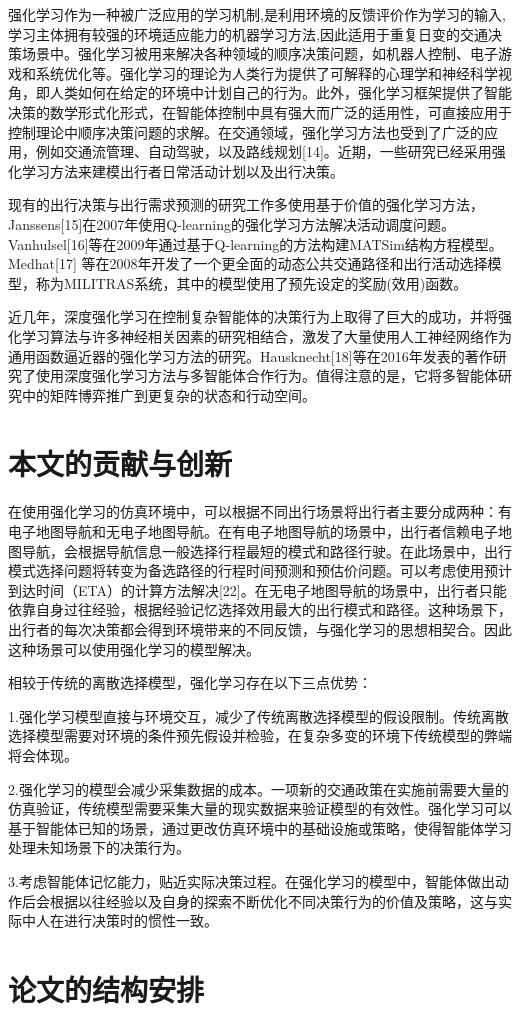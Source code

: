 强化学习作为一种被广泛应用的学习机制,是利用环境的反馈评价作为学习的输入,学习主体拥有较强的环境适应能力的机器学习方法,因此适用于重复日变的交通决策场景中。强化学习被用来解决各种领域的顺序决策问题，如机器人控制、电子游戏和系统优化等。强化学习的理论为人类行为提供了可解释的心理学和神经科学视角，即人类如何在给定的环境中计划自己的行为。此外，强化学习框架提供了智能决策的数学形式化形式，在智能体控制中具有强大而广泛的适用性，可直接应用于控制理论中顺序决策问题的求解。在交通领域，强化学习方法也受到了广泛的应用，例如交通流管理、自动驾驶，以及路线规划[14]。近期，一些研究已经采用强化学习方法来建模出行者日常活动计划以及出行决策。

现有的出行决策与出行需求预测的研究工作多使用基于价值的强化学习方法，Janssens[15]在2007年使用Q-learning的强化学习方法解决活动调度问题。Vanhulsel[16]等在2009年通过基于Q-learning的方法构建MATSim结构方程模型。Medhat[17] 等在2008年开发了一个更全面的动态公共交通路径和出行活动选择模型，称为MILITRAS系统，其中的模型使用了预先设定的奖励(效用)函数。

近几年，深度强化学习在控制复杂智能体的决策行为上取得了巨大的成功，并将强化学习算法与许多神经相关因素的研究相结合，激发了大量使用人工神经网络作为通用函数逼近器的强化学习方法的研究。Hausknecht[18]等在2016年发表的著作研究了使用深度强化学习方法与多智能体合作行为。值得注意的是，它将多智能体研究中的矩阵博弈推广到更复杂的状态和行动空间。


\section{本文的贡献与创新}

在使用强化学习的仿真环境中，可以根据不同出行场景将出行者主要分成两种：有电子地图导航和无电子地图导航。在有电子地图导航的场景中，出行者信赖电子地图导航，会根据导航信息一般选择行程最短的模式和路径行驶。在此场景中，出行模式选择问题将转变为备选路径的行程时间预测和预估价问题。可以考虑使用预计到达时间（ETA）的计算方法解决[22]。在无电子地图导航的场景中，出行者只能依靠自身过往经验，根据经验记忆选择效用最大的出行模式和路径。这种场景下，出行者的每次决策都会得到环境带来的不同反馈，与强化学习的思想相契合。因此这种场景可以使用强化学习的模型解决。

相较于传统的离散选择模型，强化学习存在以下三点优势：

1.强化学习模型直接与环境交互，减少了传统离散选择模型的假设限制。传统离散选择模型需要对环境的条件预先假设并检验，在复杂多变的环境下传统模型的弊端将会体现。

2.强化学习的模型会减少采集数据的成本。一项新的交通政策在实施前需要大量的仿真验证，传统模型需要采集大量的现实数据来验证模型的有效性。强化学习可以基于智能体已知的场景，通过更改仿真环境中的基础设施或策略，使得智能体学习处理未知场景下的决策行为。

3.考虑智能体记忆能力，贴近实际决策过程。在强化学习的模型中，智能体做出动作后会根据以往经验以及自身的探索不断优化不同决策行为的价值及策略，这与实际中人在进行决策时的惯性一致。


\section{论文的结构安排}